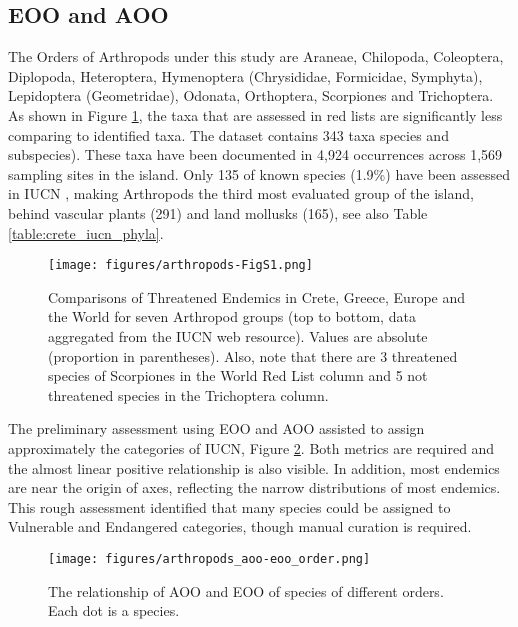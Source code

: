     \subsection{EOO and AOO}
    \label{subsec:arthropods-sampling}

The Orders of Arthropods under this study are Araneae, Chilopoda, Coleoptera,
Diplopoda, Heteroptera, Hymenoptera (Chrysididae, Formicidae, Symphyta),
Lepidoptera (Geometridae), Odonata, Orthoptera, Scorpiones and Trichoptera.
As shown in Figure \ref{fig:arthropods-figS1}, the taxa that are assessed in red lists are 
significantly less comparing to identified taxa. The dataset contains 343 taxa species and subspecies).
These taxa have been documented in 4,924 occurrences across 1,569 sampling sites in the island.
Only 135 of known species (1.9\%) have been assessed in IUCN \parencite{legakis2018},
making Arthropods the third most evaluated group of the
island, behind vascular plants (291) and land mollusks (165), see also Table \ref{table:crete_iucn_phyla}.

    \begin{figure}[htp!]
      \centering
      \texttt{[image: figures/arthropods-FigS1.png]}
      \caption[Comparisons of Threatened Endemics in Crete, Greece, Europe and the World]{Comparisons of Threatened Endemics in Crete, Greece, Europe and the World for seven Arthropod groups (top to bottom, data aggregated from the IUCN web resource). Values are absolute (proportion in parentheses). Also, note that there are 3 threatened species of Scorpiones in the World Red List column and 5 not threatened species in the Trichoptera column.}
      \label{fig:arthropods-figS1}
   \end{figure}

The preliminary assessment using EOO and AOO assisted to assign approximately the 
categories of IUCN, Figure \ref{fig:arthropods-eoo-aoo}.
Both metrics are required and the almost linear positive relationship is also visible. 
In addition, most endemics are near the origin of axes, reflecting the narrow 
distributions of most endemics.
This rough assessment 
identified that many species could be assigned to Vulnerable and Endangered categories, though 
manual curation is required. 

   \begin{figure}[htb!]
      \centering
      \texttt{[image: figures/arthropods\_aoo-eoo\_order.png]}
      \caption[AOO, EOO relationship per order]{The relationship of AOO and EOO of species of different orders. Each dot is a species. }
      \label{fig:arthropods-eoo-aoo}
   \end{figure}


